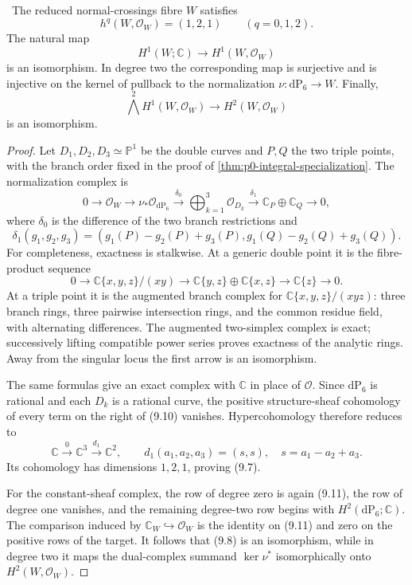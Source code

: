\begin{lemma}
\label{lem:cusp-structure-sheaf-audit}
\Verified\ The reduced normal-crossings fibre \(W\) satisfies
\[
 h^q(W,\mathcal O_W)=(1,2,1)\qquad(q=0,1,2).
\tag{9.7}
\]
The natural map
\[
 H^1(W;\mathbb C)\longrightarrow H^1(W,\mathcal O_W)
\tag{9.8}
\]
is an isomorphism.  In degree two the corresponding map is surjective and
is injective on the kernel of pullback to the normalization
\(\nu:\mathrm{dP}_6\to W\).  Finally,
\[
 \bigwedge^2H^1(W,\mathcal O_W)
 \longrightarrow H^2(W,\mathcal O_W)
\tag{9.9}
\]
is an isomorphism.
\end{lemma}

\begin{proof}
Let \(D_1,D_2,D_3\simeq\mathbb P^1\) be the double curves and \(P,Q\) the
two triple points, with the branch order fixed in the proof of
\cref{thm:p0-integral-specialization}.  The normalization complex is
\[
0\longrightarrow\mathcal O_W\longrightarrow
 \nu_*\mathcal O_{\mathrm{dP}_6}\xrightarrow{\delta_0}
 \bigoplus_{k=1}^3\mathcal O_{D_k}\xrightarrow{\delta_1}
 \mathbb C_P\oplus\mathbb C_Q\longrightarrow0,
\tag{9.10}
\]
where \(\delta_0\) is the difference of the two branch restrictions and
\[
 \delta_1(g_1,g_2,g_3)
 =(g_1(P)-g_2(P)+g_3(P),
   g_1(Q)-g_2(Q)+g_3(Q)).
\]
For completeness, exactness is stalkwise.  At a generic double point it is
the fibre-product sequence
\[
0\to\mathbb C\{x,y,z\}/(xy)
 \to\mathbb C\{y,z\}\oplus\mathbb C\{x,z\}
 \to\mathbb C\{z\}\to0.
\]
At a triple point it is the augmented branch complex for
\(\mathbb C\{x,y,z\}/(xyz)\): three branch rings, three pairwise
intersection rings, and the common residue field, with alternating
differences.  The augmented two-simplex complex is exact; successively
lifting compatible power series proves exactness of the analytic rings.
Away from the singular locus the first arrow is an isomorphism.

The same formulas give an exact complex with \(\mathbb C\) in place of
\(\mathcal O\).  Since \(\mathrm{dP}_6\) is rational and each \(D_k\) is a
rational curve, the positive structure-sheaf cohomology of every term on
the right of (9.10) vanishes.  Hypercohomology therefore reduces to
\[
 \mathbb C\xrightarrow{0}\mathbb C^3
 \xrightarrow{d_1}\mathbb C^2,
 \qquad
 d_1(a_1,a_2,a_3)=(s,s),\quad s=a_1-a_2+a_3.
\tag{9.11}
\]
Its cohomology has dimensions \(1,2,1\), proving (9.7).

For the constant-sheaf complex, the row of degree zero is again (9.11),
the row of degree one vanishes, and the remaining degree-two row begins
with \(H^2(\mathrm{dP}_6;\mathbb C)\).  The comparison induced by
\(\mathbb C_W\hookrightarrow\mathcal O_W\) is the identity on (9.11) and
zero on the positive rows of the target.  It follows that (9.8) is an
isomorphism, while in degree two it maps the dual-complex summand
\(\ker\nu^*\) isomorphically onto \(H^2(W,\mathcal O_W)\).


\end{proof}
